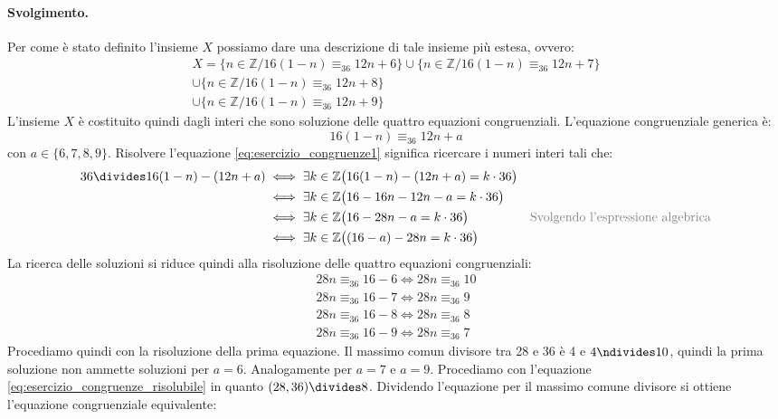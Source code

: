 \paragraph*{Svolgimento.} Per come è stato definito l'insieme $X$ possiamo dare una descrizione di tale insieme più estesa, ovvero:
\begin{align*}
	X = \{n \in \mathbb{Z} / 16(1-n) \equiv_{36} 12n+ 6 \} \cup \{n \in \mathbb{Z} / 16(1-n) \equiv_{36} 12n+ 7\} \\
	\cup \{n \in \mathbb{Z} / 16(1-n) \equiv_{36} 12n+8\} \\
	\cup \{n \in \mathbb{Z} / 16(1-n) \equiv_{36} 12n+9\}
\end{align*}
L'insieme $X$ è costituito quindi dagli interi che sono soluzione delle quattro equazioni congruenziali. L'equazione congruenziale generica è:
\begin{equation}\label{eq:esercizio_congruenze1}
	16(1-n) \equiv_{36} 12n+a
\end{equation}
con $a \in \{6,7,8,9\}$. Risolvere l'equazione \ref{eq:esercizio_congruenze1} significa ricercare i numeri interi tali che:
\begin{align*}
	36 \divides 16(1-n) - (12n+a) &\iff \exists k \in \mathbb{Z} \bigl(16(1-n) - (12n+a) = k \cdot 36 \bigr) \\
	&\iff \exists k \in \mathbb{Z} \bigl(16-16n - 12n -a = k \cdot 36 \bigr) \\
	&\iff \exists k \in \mathbb{Z} \bigl(16-28n -a = k \cdot 36 \bigr) & \text{\textcolor{gray}{Svolgendo l'espressione algebrica}}\\
	&\iff \exists k \in \mathbb{Z} \bigl((16-a) -28n = k \cdot 36\bigr) \\
\end{align*}
La ricerca delle soluzioni si riduce quindi alla risoluzione delle quattro equazioni congruenziali:
\begin{eqnarray}
	28n \equiv_{36} 16-6  \iff 28n \equiv_{36} 10 \\
	28n \equiv_{36} 16-7  \iff 28n \equiv_{36} 9\\
	28n \equiv_{36} 16-8  \iff 28n \equiv_{36} 8 \label{eq:esercizio_congruenze_risolubile}\\
	28n \equiv_{36} 16-9 \iff 28n \equiv_{36} 7
\end{eqnarray}
Procediamo quindi con la risoluzione della prima equazione. Il massimo comun divisore tra 28 e 36 è 4 e $4 \ndivides 10$, quindi la prima soluzione non ammette soluzioni per $a=6$. Analogamente per $a=7$ e $a=9$. Procediamo con l'equazione \ref{eq:esercizio_congruenze_risolubile} in quanto $(28,36) \divides 8$. Dividendo l'equazione per il massimo comune divisore si ottiene l'equazione congruenziale equivalente:
